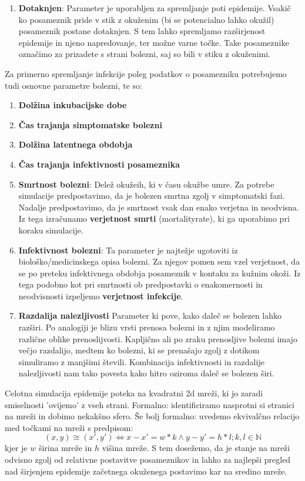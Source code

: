 \documentclass[a4paper, 11pt]{article}
\begin{document}
\begin{enumerate}
\item \textbf{Dotaknjen}: Parameter je uporabljen za spremljanje poti epidemije. Vsakič ko posameznik pride v stik z okuženim (bi se potencialno lahko okužil) posameznik postane dotaknjen. S tem lahko spremljamo razširjenost epidemije in njeno napredovanje, ter možne varne točke. Take posameznike označimo za prizadete s strani bolezni, saj so bili v stiku z okuženimi.

\end{enumerate}

Za primerno spremljanje infekcije poleg podatkov o posamezniku potrebujemo tudi osnovne parametre bolezni, te so:
\begin{enumerate}
\item \textbf{Dolžina inkubacijske dobe}
\item \textbf{Čas trajanja simptomatske bolezni}
\item \textbf{Dolžina latentnega obdobja}
\item \textbf{Čas trajanja infektivnosti posameznika}
\item \textbf{Smrtnost bolezni}: Delež okužeih, ki v času okužbe umre. Za potrebe simulacije predpostavimo, da je bolezen smrtna zgolj v simptomatski fazi. Nadalje predpostavimo, da je smrtnost vsak dan enako verjetna in neodvisna. Iz tega izračunamo \textbf{verjetnost smrti} (mortality\textunderscore rate), ki ga uporabimo pri koraku simulacije.
\item \textbf{Infektivnost bolezni}: Ta parameter je najtežje ugotoviti iz biološko/medicinskega opisa bolezni. Za njegov pomen sem vzel verjetnost, da se po preteku infektivnega obdobja posameznik v kontaku za kužnim okoži. Iz tega podobno kot pri smrtnosti ob predpostavki o enakomernosti in neodvisnosti izpeljemo \textbf{verjetnost infekcije}.
\item \textbf{Razdalija nalezljivosti} Parameter ki pove, kako daleč se bolezen lahko razširi. Po analogiji je blizu vrsti prenosa bolezni in z njim modeliramo različne oblike prenoslijvosti. Kapljično ali po zraku prenosljive bolezni imajo večjo razdalijo, medtem ko bolezni, ki se prenašajo zgolj z dotikom simuliramo z manjšimi števili. Kombinacija infektivnosti in razdalije nalezljivosti nam tako povesta kako hitro oziroma daleč se bolezen širi.
\end{enumerate}

Celotna simulacija epidemije poteka na kvadratni 2d mreži, ki jo zaradi smiselnosti 'ovijemo' z vseh strani. Formalno: identificiramo nasprotni si stranici na mreži in dobimo nekakšno sfero. Še bolj formalno: uvedemo ekvivalčno relacijo med točkami na mreži s predpisom: 
$$(x,y) \cong (x',y') \iff x-x' = w*k \land y-y' = h*l; k,l \in \mathbb{N}$$
kjer je $w$ širina mreže in $h$ višina mreže. S tem dosežemo, da je stanje na mreži odvisno zgolj od relativne postavitve posameznikov in lahko za najlepši pregled nad širjenjem epidemije začetnega okuženega postavimo kar na sredino mreže.
\end{document}
